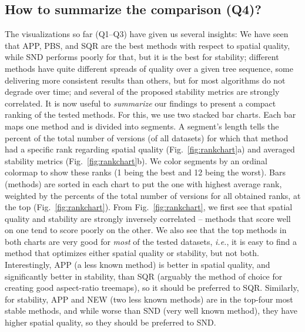 \subsection{How to summarize the comparison (Q4)?}
\label{sec:q4}
%
%
The visualizations so far (Q1--Q3) have given us several insights: We have seen that APP, PBS, and SQR are the best methods with respect to spatial quality, while SND performs poorly for that, but it is the best for stability; different methods have quite different spreads of quality over a given tree sequence, some delivering more consistent results than others, but for most algorithms do not degrade over time; and several of the proposed stability metrics are strongly correlated. It is now useful to \emph{summarize} our findings to present a compact ranking of the tested methods. For this, we use two stacked bar charts. Each bar maps one method and is divided into segments. A segment's length tells the percent of the total number of versions (of all datasets) for which that method had a specific rank regarding spatial quality (Fig.~\ref{fig:rankchart}a) and averaged stability metrics (Fig.~\ref{fig:rankchart}b). We color segments by an ordinal colormap to show these ranks (1 being the best and 12 being the worst). Bars (methods) are sorted in each chart to put the one with highest average rank, weighted by the percents of the total number of versions for all obtained ranks, at the top (Fig.~\ref{fig:rankchart}). From Fig.~\ref{fig:rankchart}, we first see that spatial quality and stability are strongly inversely correlated -- methods that score well on one tend to score poorly on the other. We also see that the top methods in both charts are very good for \emph{most} of the tested datasets, \emph{i.e.}, it is easy to find a method that optimizes either spatial quality or stability, but not both. Interestingly, APP (a less known method) is better in spatial quality, and significantly better in stability, than SQR (arguably the method of choice for creating good aspect-ratio treemaps), so it should be preferred to SQR. Similarly, for stability, APP and NEW (two less known methods) are in the top-four most stable methods, and while worse than SND (very well known method), they have higher spatial quality, so they should be preferred to SND.

